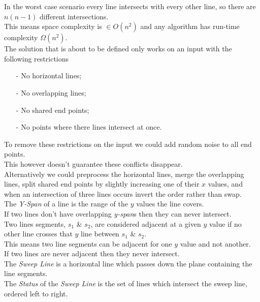 \documentclass[11pt,a4paper]{article}
\begin{document}
In the worst case scenario every line intersects with every other line, so there are $n(n-1)$ different intersections.\\
This means space complexity is $\in O(n^2)$ and any algorithm has run-time complexity $\Omega(n^2)$.\\

\newpage
{}
The solution that is about to be defined only works on an input with the following restrictions
\begin{itemize}
  \item[-]No horizontal lines;
  \item[-]No overlapping lines;
  \item[-]No shared end points;
  \item[-]No points where there lines intersect at once.
\end{itemize}

To remove these restrictions on the input we could add random noise to all end points.\\
This however doesn't guarantee these conflicts disappear.\\
Alternatively we could preprocess the horizontal lines, merge the overlapping lines, split shared end points by slightly increasing one of their $x$ values, and when an intersection of three lines occurs invert the order rather than swap.\\

The \textit{Y-Span} of a line is the range of the $y$ values the line covers.\\

If two lines don't have overlapping \textit{y-span}s then they can never intersect.\\

Two lines segments, $s_1$ \& $s_2$, are considered adjacent at a given $y$ value if no other line crosses that $y$ line between $s_1$ \& $s_2$.\\
This means two line segments can be adjacent for one $y$ value and not another.\\
\nb If two lines are never adjacent then they never intersect.\\

The \textit{Sweep Line} is a horizontal line which passes down the plane containing the line segments.\\
The \textit{Status} of the \textit{Sweep Line} is the set of lines which intersect the sweep line, ordered left to right.\\
\end{document}
